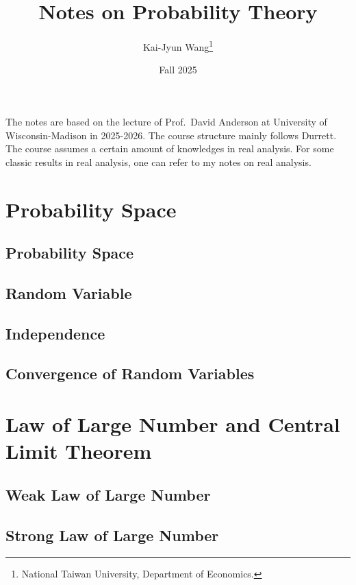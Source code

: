 \documentclass[a4paper, 12pt]{article}
\title{Notes on Probability Theory}
\author{Kai-Jyun Wang\thanks{National Taiwan University, Department of Economics.}}
\date{Fall 2025}
\begin{document}
 
\maketitle

The notes are based on the lecture of Prof.\ David Anderson at University of Wisconsin-Madison 
in 2025-2026. The course structure mainly follows Durrett. The course assumes 
a certain amount of knowledges in real analysis. For some classic results 
in real analysis, one can refer to my notes on real analysis.  

\newpage 
\tableofcontents
\newpage

\section{Probability Space}
\subsection{Probability Space}

\newpage

\subsection{Random Variable}

\newpage

\subsection{Independence}

\newpage

\subsection{Convergence of Random Variables}

\newpage

\section{Law of Large Number and Central Limit Theorem}

\subsection{Weak Law of Large Number}

\newpage

\subsection{Strong Law of Large Number}

\newpage
\end{document}
